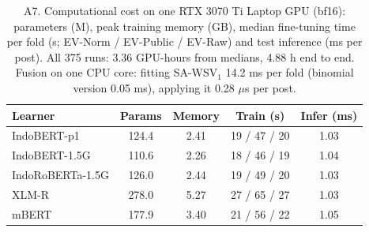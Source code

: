 \begin{table}[!htbp]\centering\scriptsize
\caption*{A7. Computational cost on one RTX 3070 Ti Laptop GPU (bf16): parameters (M), peak training memory (GB), median fine-tuning time per fold (s; EV-Norm / EV-Public / EV-Raw) and test inference (ms per post). All 375 runs: 3.36 GPU-hours from medians, 4.88 h end to end. Fusion on one CPU core: fitting SA-WSV$_1$ 14.2 ms per fold (binomial version 0.05 ms), applying it 0.28 $\mu$s per post.}
\begin{tabular}{lcccc}\toprule
Learner & Params & Memory & Train (s) & Infer (ms) \\ \midrule
IndoBERT-p1 & 124.4 & 2.41 & 19 / 47 / 20 & 1.03 \\
IndoBERT-1.5G & 110.6 & 2.26 & 18 / 46 / 19 & 1.04 \\
IndoRoBERTa-1.5G & 126.0 & 2.44 & 19 / 49 / 20 & 1.03 \\
XLM-R & 278.0 & 5.27 & 27 / 65 / 27 & 1.03 \\
mBERT & 177.9 & 3.40 & 21 / 56 / 22 & 1.05 \\
\bottomrule\end{tabular}\end{table}
